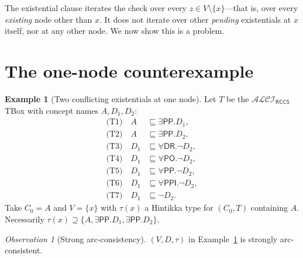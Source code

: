 \documentclass[11pt]{article}
\theoremstyle{definition}
\newtheorem{example}[theorem]{Example}
\theoremstyle{remark}
\newtheorem{observation}[theorem]{Observation}
\newcommand{\DR}{\mathsf{DR}}
\newcommand{\PO}{\mathsf{PO}}
\newcommand{\PP}{\mathsf{PP}}
\newcommand{\PPI}{\mathsf{PPI}}
\newcommand{\ALCIRCC}[1]{\mathcal{ALCI}_{\mathsf{RCC#1}}}
\begin{document}
The existential clause iterates the check over every $z \in V
\setminus \{x\}$---that is, over every \emph{existing} node other
than $x$.  It does not iterate over other \emph{pending} existentials
at $x$ itself, nor at any other node.  We now show this is a
problem.

\section{The one-node counterexample}
\label{sec:ce}

\begin{example}[Two conflicting existentials at one node]
\label{ex:one-node}
Let $T$ be the $\ALCIRCC{5}$ TBox with concept names $A, D_1, D_2$:
\begin{align*}
  \text{(T1)} \quad A    &\sqsubseteq \exists \PP. D_1, \\
  \text{(T2)} \quad A    &\sqsubseteq \exists \PP. D_2, \\
  \text{(T3)} \quad D_1  &\sqsubseteq \forall \DR.  \neg D_2, \\
  \text{(T4)} \quad D_1  &\sqsubseteq \forall \PO.  \neg D_2, \\
  \text{(T5)} \quad D_1  &\sqsubseteq \forall \PP.  \neg D_2, \\
  \text{(T6)} \quad D_1  &\sqsubseteq \forall \PPI. \neg D_2, \\
  \text{(T7)} \quad D_1  &\sqsubseteq \neg D_2.
\end{align*}
Take $C_0 = A$ and $V = \{x\}$ with $\tau(x)$ a Hintikka type for
$(C_0, T)$ containing $A$.  Necessarily $\tau(x) \supseteq
\{A, \exists \PP. D_1, \exists \PP. D_2\}$.
\end{example}

\begin{observation}[Strong arc-consistency]
\label{obs:strong}
$(V, D, \tau)$ in Example~\ref{ex:one-node} is strongly arc-consistent.
\end{observation}
\end{document}
